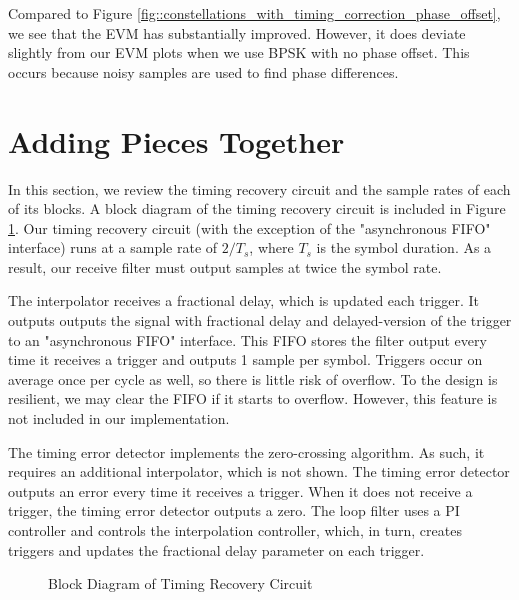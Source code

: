 \documentclass{article}
\begin{document}
Compared to Figure \ref{fig::constellations_with_timing_correction_phase_offset}, we see that the EVM has substantially improved. However, it does deviate slightly from our EVM plots when we use BPSK with no phase offset. This occurs because noisy samples are used to find phase differences.

\section{Adding Pieces Together}

In this section, we review the timing recovery circuit and the sample rates of each of its blocks. A block diagram of the timing recovery circuit is included in Figure \ref{fig::timing_recovery_block_diagram_2}. Our timing recovery circuit (with the exception of the "asynchronous FIFO" interface) runs at a sample rate of $2/T_s$, where $T_s$ is the symbol duration. As a result, our receive filter must output samples at twice the symbol rate.

	The interpolator receives a fractional delay, which is updated each trigger. It outputs outputs the signal with fractional delay and delayed-version of the trigger to an "asynchronous FIFO" interface. This FIFO stores the filter output every time it receives a trigger and outputs 1 sample per symbol. Triggers occur on average once per cycle as well, so there is little risk of overflow. To the design is resilient, we may clear the FIFO if it starts to overflow. However, this feature is not included in our implementation.
	
	The timing error detector implements the zero-crossing algorithm. As such, it requires an additional interpolator, which is not shown. The timing error detector outputs an error every time it receives a trigger. When it does not receive a trigger, the timing error detector outputs a zero. The loop filter uses a PI controller and controls the interpolation controller, which, in turn, creates triggers and updates the fractional delay parameter on each trigger.
	
\begin{figure}[H]
	\centerline{}
	\caption{Block Diagram of Timing Recovery Circuit}
	\label{fig::timing_recovery_block_diagram_2}
\end{figure}
\end{document}
